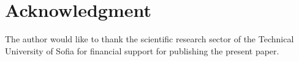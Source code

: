 \documentclass[conference,a4paper]{IEEEtran}
\begin{document}










\section*{Acknowledgment}
The author would like to thank the scientific research sector of the Technical University of Sofia for financial support for publishing the present paper.



\end{document}
